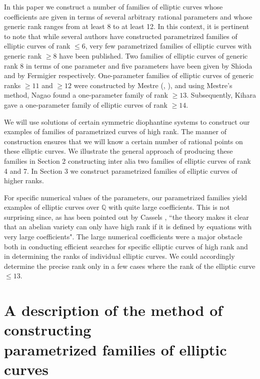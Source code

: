 \documentclass[11pt, leqno]{article}
\begin{document}
In this paper we construct a number of  families of elliptic curves whose coefficients are given in terms of several arbitrary rational parameters and whose generic rank ranges from at least 8 to at least 12. In this context, it is pertinent to note that while several authors have constructed  parametrized families of elliptic curves of rank $\leq 6$, very few parametrized families of elliptic curves with generic rank $\geq 8$ have been published. Two families of elliptic curves of generic rank 8 in terms of one parameter and five parameters have been given  by Shioda \cite{Sh} and by Fermigier \cite{Fe} respectively. One-parameter families of elliptic curves of generic ranks $\geq 11$ and $\geq 12$ were constructed by Mestre (\cite{Me1}, \cite{Me2}), and using Mestre's method, Nagao \cite{Na} found a one-parameter family of rank $\geq 13$. Subsequently, Kihara \cite{Ki} gave a one-parameter family of elliptic curves of rank $\geq 14$.

We will use solutions of certain symmetric diophantine systems to construct our examples of families of parametrized curves of high rank. The manner of construction ensures that we will know a certain number of rational points on these elliptic curves. We illustrate  the general approach  of producing  these families in Section 2 constructing inter alia two families of elliptic curves of rank 4 and 7. In Section 3 we construct parametrized  families of elliptic curves of higher ranks. 

For specific numerical values of the parameters, our parametrized families  yield examples of elliptic curves over $\mathbb{Q}$ with quite large  coefficients. This is not surprising since, as has been pointed out by Cassels \cite[p. 257]{Ca1}, ``the theory makes it clear that an abelian variety can only have high rank if it is defined by equations with very large coefficients". The large numerical coefficients were a major obstacle both in conducting efficient searches for specific elliptic curves of high rank and in determining the ranks of individual elliptic curves. We could accordingly  determine the precise rank only in a few cases where the rank of the elliptic curve $\leq 13$. 


\section{A description  of the  method of constructing \\parametrized families of elliptic curves}
\end{document}

